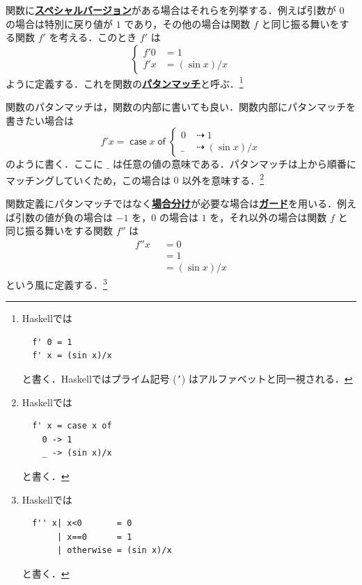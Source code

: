 \documentclass[a4paper,twocolumn]{jsbook}
\newcommand{\programminglanguage}[1]{\textsf{#1}}
\newcommand{\haskell}{\programminglanguage{Haskell}}
\newcommand{\keyword}[1]{{\underline{\textbf{#1}}}}
\newcommand{\code}[1]{\texttt{#1}}
\newcommand{\mKeyword}[1]{\mathsf{#1}} %
\newcommand{\mIfKeyword}{\mKeyword{if}}
\newcommand{\mCaseKeyword}{\mKeyword{case}}
\newcommand{\mOfKeyword}{\mKeyword{of}}
\newcommand{\mOtherwiseKeyword}{\mKeyword{otherwise}}
\DeclareMathOperator{\mCaseKW}{\mCaseKeyword} %
\DeclareMathOperator{\mIf}{\mIfKeyword}
\DeclareMathOperator{\mOfKW}{\mOfKeyword} %
\DeclareMathOperator{\mOtherwise}{\mOtherwiseKeyword}
\newcommand{\mAnyParam}{\_}
\DeclareMathOperator{\mIfSo}{\dashrightarrow}
\newcommand{\mGuard}[1]{\mathop{\mid_{#1}}}
\newcommand{\mCaseOf}[1]{\mCaseKW#1\mOfKW}
\begin{document}
関数に\keyword{スペシャルバージョン}がある場合はそれらを列挙する．例えば引数が $0$ の場合は特別に戻り値が $1$ であり，その他の場合は関数 $f$ と同じ振る舞いをする関数 $f'$ を考える．このとき $f'$ は
\begin{equation}
\left\{
\begin{aligned}
f'0&=1\\
f'x&=(\sin x)/x
\end{aligned}
\right.
\end{equation}
ように定義する．これを関数の\keyword{パタンマッチ}と呼ぶ．\footnote{\haskell では
\begin{verbatim}
  f' 0 = 1
  f' x = (sin x)/x
\end{verbatim}
と書く．\haskell ではプライム記号 (\code{'}) はアルファベットと同一視される．}

関数のパタンマッチは，関数の内部に書いても良い．関数内部にパタンマッチを書きたい場合は
\begin{equation}
f'x=\mCaseOf{x}\left\{
\begin{aligned}
0&\mIfSo1\\
\mAnyParam&\mIfSo(\sin x)/x
\end{aligned}
\right.
\end{equation}
のように書く．ここに $\mAnyParam$ は任意の値の意味である．パタンマッチは上から順番にマッチングしていくため，この場合は $0$ 以外を意味する．\footnote{\haskell では
\begin{verbatim}
  f' x = case x of
    0 -> 1
    _ -> (sin x)/x
\end{verbatim}
と書く．}

関数定義にパタンマッチではなく\keyword{場合分け}が必要な場合は\keyword{ガード}を用いる．例えば引数の値が負の場合は $-1$ を，$0$ の場合は $1$ を，それ以外の場合は関数 $f$ と同じ振る舞いをする関数 $f''$ は
\begin{equation}
\begin{aligned}
f''x&\mGuard{x<0}=0\\
&\mGuard{x\equiv 0}=1\\
&\mGuard{\mOtherwise}=(\sin x)/x
\end{aligned}
\end{equation}
という風に定義する．\footnote{\haskell では
\begin{verbatim}
  f'' x| x<0       = 0
       | x==0      = 1
       | otherwise = (sin x)/x
\end{verbatim}
と書く．}

\end{document}
